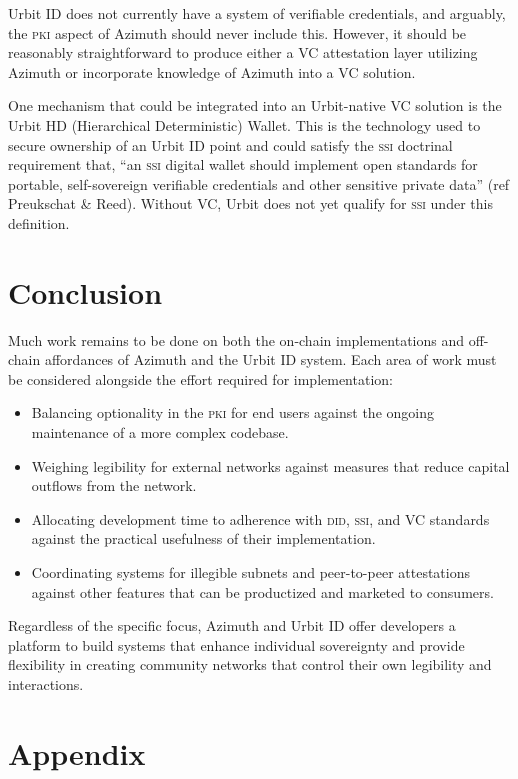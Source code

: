 \documentclass[twoside]{article}
\begin{document}
Urbit ID does not currently have a system of verifiable credentials, and arguably, the \textsc{pki} aspect of Azimuth should never include this. However, it should be reasonably straightforward to produce either a VC attestation layer utilizing Azimuth or incorporate knowledge of Azimuth into a VC solution.  

One mechanism that could be integrated into an Urbit-native VC solution is the Urbit HD (Hierarchical Deterministic) Wallet. This is the technology used to secure ownership of an Urbit ID point and could satisfy the \textsc{ssi} doctrinal requirement that, “an \textsc{ssi} digital wallet should implement open standards for portable, self-sovereign verifiable credentials and other sensitive private data” (ref Preukschat & Reed). Without VC, Urbit does not yet qualify for \textsc{ssi} under this definition.  


\section{Conclusion}

Much work remains to be done on both the on-chain implementations and off-chain affordances of Azimuth and the Urbit ID system. Each area of work must be considered alongside the effort required for implementation:

\begin{itemize}
  \item  Balancing optionality in the \textsc{pki} for end users against the ongoing maintenance of a more complex codebase.
  \item  Weighing legibility for external networks against measures that reduce capital outflows from the network.
  \item  Allocating development time to adherence with \textsc{did}, \textsc{ssi}, and VC standards against the practical usefulness of their implementation.
  \item  Coordinating systems for illegible subnets and peer-to-peer attestations against other features that can be productized and marketed to consumers.
\end{itemize}

Regardless of the specific focus, Azimuth and Urbit ID offer developers a platform to build systems that enhance individual sovereignty and provide flexibility in creating community networks that control their own legibility and interactions. \tombstone{}

\section{Appendix}
\end{document}
